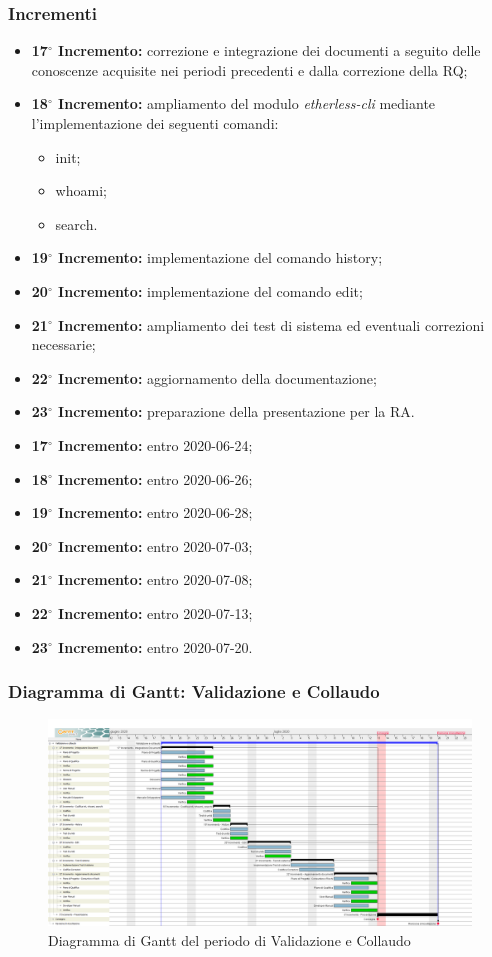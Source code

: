 	\subsubsection{Incrementi}
			\begin{itemize}
				\item \textbf{17$^{\circ}$ Incremento:} correzione e integrazione dei documenti a seguito delle conoscenze acquisite nei periodi precedenti e dalla correzione della RQ;
				\item \textbf{18$^{\circ}$ Incremento:} ampliamento del modulo \textit{etherless-cli} mediante l'implementazione dei seguenti comandi:
					\begin{itemize}
						\item init;
						\item whoami;
						\item search.
					\end{itemize}
				\item \textbf{19$^{\circ}$ Incremento:} implementazione del comando history;
				\item \textbf{20$^{\circ}$ Incremento:} implementazione del comando edit;
				\item \textbf{21$^{\circ}$ Incremento:} ampliamento dei test di sistema ed eventuali correzioni necessarie;
				\item \textbf{22$^{\circ}$ Incremento:} aggiornamento della documentazione;
				\item \textbf{23$^{\circ}$ Incremento:} preparazione della presentazione per la RA.
			\end{itemize}
			\begin{itemize}
				\item \textbf{17$^{\circ}$ Incremento:} entro 2020-06-24;
				\item \textbf{18$^{\circ}$ Incremento:} entro 2020-06-26;
				\item \textbf{19$^{\circ}$ Incremento:} entro 2020-06-28;
				\item \textbf{20$^{\circ}$ Incremento:} entro 2020-07-03;
				\item \textbf{21$^{\circ}$ Incremento:} entro 2020-07-08;
				\item \textbf{22$^{\circ}$ Incremento:} entro 2020-07-13;
				\item \textbf{23$^{\circ}$ Incremento:} entro 2020-07-20.
			\end{itemize}

	\subsubsection{Diagramma di Gantt: Validazione e Collaudo}
		\begin{figure}[h]
			\centering
			\includegraphics[width=1.1\textwidth]{./res/img/DiagrammiGantt/validaGantt}
			\caption{Diagramma di Gantt del periodo di Validazione e Collaudo}
		\end{figure}
